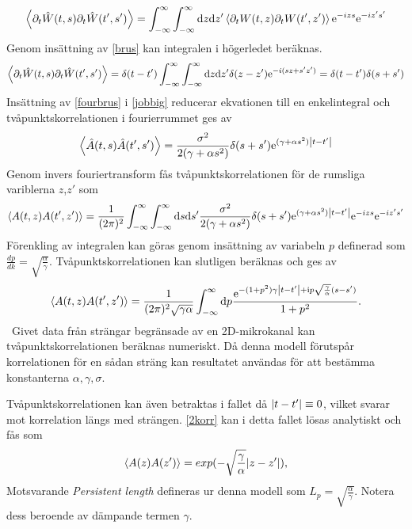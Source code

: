 \begin{equation}
    \ev{\partial_{t}\hat{W}(t,s)\partial_{t}\hat{W}(t',s')}=\int_{-\infty}^{\infty}\int_{-\infty}^{\infty}\dd z \dd z'\ev{\partial_{t}W(t,z)\partial_{t}W(t',z')}\ee^{-izs}\ee^{-iz's'}
\end{equation}
Genom insättning av \eqref{brus} kan integralen i högerledet beräknas.
\begin{equation}\label{fourbrus}
    \ev{\partial_{t}\hat{W}(t,s)\partial_{t}\hat{W}(t',s')}=\delta(t-t')\int_{-\infty}^{\infty}\int_{-\infty}^{\infty}\dd z \dd z'\delta(z-z')\ee^{-i(sz+s'z')}=\delta(t-t')\delta(s+s')
\end{equation}
Insättning av \eqref{fourbrus} i \eqref{jobbig} reducerar ekvationen till en enkelintegral och tvåpunktskorrelationen i fourierrummet ges av
\begin{equation}
    \ev{\hat{A}(t,s)\hat{A}(t',s')}=\frac{\sigma^2}{2(\gamma+\alpha s^2)}\delta(s+s')\ee^{(\gamma+\alpha s^2)\abs{t-t'}}
\end{equation}
Genom invers fouriertransform fås tvåpunktskorrelationen för de rumsliga variblerna $z$,$z'$ som
\begin{equation}
    \ev{A(t,z)A(t',z')}=\frac{1}{(2\pi)^2}\int_{-\infty}^{\infty}\int_{-\infty}^{\infty}\dd s \dd s'\frac{\sigma^2}{2(\gamma+\alpha s^2)}\delta(s+s')\ee^{(\gamma+\alpha s^2)\abs{t-t'}}\ee^{-izs}\ee^{-iz's'}
\end{equation}
Förenkling av integralen kan göras genom insättning av variabeln $p$ definerad som $\frac{dp}{dk}=\sqrt{\frac{\alpha}{\gamma}}$. Tvåpunktskorrelationen kan slutligen beräknas och ges av 
\begin{equation}
\label{2korr}
    \ev{A(t,z)A(t',z')}=\frac{1}{(2\pi)^2\sqrt{\gamma\alpha}}\int_{-\infty}^{\infty}\dd p \frac{\ee^{-(1+p^2)\gamma \abs{t-t'}+\ii p\sqrt{\frac{\gamma}{\alpha}}(s-s')}}{1+p^2}.
\end{equation}
\
Givet data från strängar begränsade av en 2D-mikrokanal kan tvåpunktskorrelationen beräknas numeriskt. Då denna modell förutspår korrelationen för en sådan sträng kan resultatet användas för att bestämma konstanterna $\alpha,\gamma,\sigma$. 

Tvåpunktskorrelationen kan även betraktas i fallet då $\abs{t-t'}\equiv 0$, vilket svarar mot korrelation längs med strängen. \eqref{2korr} kan i detta fallet lösas analytiskt och fås som
\begin{equation}
\ev{A(z)A(z')}=exp(-\sqrt{\frac{\gamma}{\alpha}}\abs{z-z'}),
\end{equation}
Motsvarande \emph{Persistent length} defineras ur denna modell som $L_{p}=\sqrt{\frac{\alpha}{\gamma}}$. Notera dess beroende av dämpande termen $\gamma$. 





